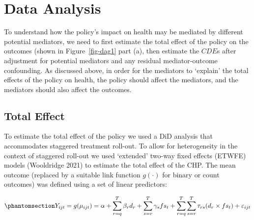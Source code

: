 \documentclass[
  letterpaper,
  DIV=11,
  numbers=noendperiod]{scrartcl}
\begin{document}
\section{Data Analysis}\label{data-analysis}

To understand how the policy's impact on health may be mediated by
different potential mediators, we need to first estimate the total
effect of the policy on the outcomes (shown in Figure~\ref{fig-dag1}
part (a), then estimate the \(CDE\)s after adjustment for potential
mediators and any residual mediator-outcome confounding. As discussed
above, in order for the mediators to `explain' the total effects of the
policy on health, the policy should affect the mediators, and the
mediators should also affect the outcomes.

\subsection{Total Effect}\label{total-effect}

To estimate the total effect of the policy we used a DiD analysis that
accommodates staggered treatment roll-out. To allow for heterogeneity in
the context of staggered roll-out we used `extended' two-way fixed
effects (ETWFE) models (Wooldridge 2021) to estimate the total effect of
the CHP. The mean outcome (replaced by a suitable link function
\(g(\cdot)\) for binary or count outcomes) was defined using a set of
linear predictors:

\begin{equation}\phantomsection\label{eq-etwfe}{Y_{ijt}=g(\mu_{ijt}) = \alpha + \sum_{r=q}^{T} \beta_{r} d_{r} + \sum_{s=r}^{T} \gamma_{s} fs_{t}+ \sum_{r=q}^{T} \sum_{s=r}^{T} \tau_{rs} (d_{r} \times fs_{t}) + \varepsilon_{ijt}}\end{equation}
\end{document}
